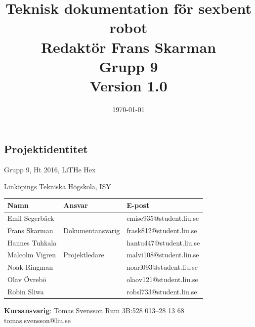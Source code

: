 \documentclass[a4paper,titlepage,12pt]{article}
\begin{document}
\listoftodos
	\title{\LARGE
		\textbf{Teknisk dokumentation för sexbent robot} \\
		\vspace*{0.5\baselineskip}
		\large
		Redaktör Frans Skarman \\
		Grupp 9 \\
		\small
		\vspace*{0.5\baselineskip}
		Version 1.0}

	\date{\today}

	\maketitle
	
	\newpage
	
	\begin{center}


		\section*{Projektidentitet}
		Grupp 9, Ht 2016, LiTHe Hex

		Linköpings Tekniska Högskola, ISY

		\renewcommand*{\arraystretch}{1.4}
		\begin{longtable}[c]{ l l l }
			\textbf{Namn} & \textbf{Ansvar} & \textbf{E-post} \\ \midrule
			Emil Segerbäck & & emise935@student.liu.se \\ \midrule
			Frans Skarman & Dokumentansvarig & frask812@student.liu.se \\ \midrule
			Hannes Tuhkala & & hantu447@student.liu.se \\ \midrule
			Malcolm Vigren & Projektledare & malvi108@student.liu.se \\ \midrule
			Noak Ringman &  & noari093@student.liu.se \\ \midrule
			Olav Övrebö &  & olaov121@student.liu.se \\ \midrule
			Robin Sliwa &  & robsl733@student.liu.se \\
		\end{longtable}

		\centering
		\textbf{Kursansvarig}: Tomas Svensson Rum 3B:528 013--28 13 68 tomas.svensson@liu.se

		\newpage
		\tableofcontents
		\newpage



\end{center}
\end{document}
